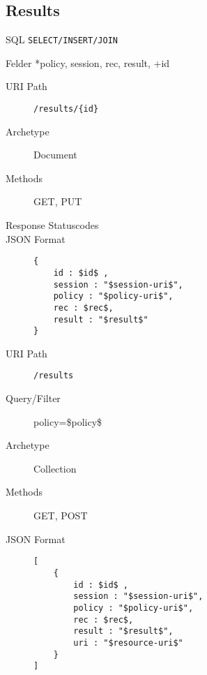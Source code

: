 \documentclass[10pt,a4paper]{scrartcl}
\begin{document}
\pagebreak
\subsection{Results}

\begin{description*}
    \item[SQL] \texttt{SELECT/INSERT/JOIN}
    \item[Felder] *policy, session, rec, result, +id
\end{description*}


\begin{mdframed}[style=def]
\begin{description}
	\item[URI Path] \texttt{/results/\{id\}}
	\item[Archetype] Document
	\item[Methods] GET, PUT
	\item[Response Statuscodes] \hfill
	\item[JSON Format] \hfill
\begin{lstlisting}
{
	id : $id$ ,
	session : "$session-uri$",
	policy : "$policy-uri$",
	rec : $rec$,
	result : "$result$"
}
\end{lstlisting}
\end{description}
\end{mdframed}

\begin{mdframed}[style=def]
\begin{description}
	\item[URI Path] \texttt{/results}
	\item[Query/Filter]	policy=\$policy\$
	\item[Archetype] Collection
	\item[Methods] GET, POST
	\item[JSON Format] \hfill
\begin{lstlisting}
[
	{
	    id : $id$ ,
    	session : "$session-uri$",
    	policy : "$policy-uri$",
    	rec : $rec$,
    	result : "$result$",
      	uri : "$resource-uri$"
    }
]
\end{lstlisting}
\end{description}
\end{mdframed}
\end{document}
